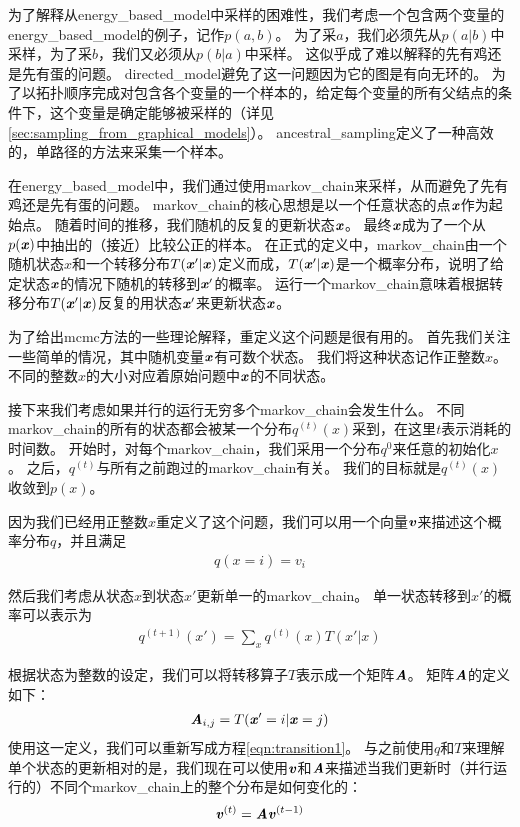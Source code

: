 为了解释从\gls{energy_based_model}中采样的困难性，我们考虑一个包含两个变量的\gls{energy_based_model}的例子，记作$p(a,b)$。
为了采$a$，我们必须先从$p(a\vert b)$中采样，为了采$b$，我们又必须从$p(b\vert a)$中采样。
这似乎成了难以解释的先有鸡还是先有蛋的问题。
\gls{directed_model}避免了这一问题因为它的图是有向无环的。
为了以拓扑顺序完成对包含各个变量的一个样本的，给定每个变量的所有父结点的条件下，这个变量是确定能够被采样的（详见\ref{sec:sampling_from_graphical_models}）。
\gls{ancestral_sampling}定义了一种高效的，单路径的方法来采集一个样本。


在\gls{energy_based_model}中，我们通过使用\gls{markov_chain}来采样，从而避免了先有鸡还是先有蛋的问题。
\gls{markov_chain}的核心思想是以一个任意状态的点$\boldsymbol{\mathit{x}}$作为起始点。
随着时间的推移，我们随机的反复的更新状态$\boldsymbol{\mathit{x}}$。
最终$\boldsymbol{\mathit{x}}$成为了一个从$p(\boldsymbol{\mathit{x}})$中抽出的（接近）比较公正的样本。
在正式的定义中，\gls{markov_chain}由一个随机状态$x$和一个转移分布$T(\boldsymbol{\mathit{x}}'\vert \boldsymbol{\mathit{x}})$定义而成，$T(\boldsymbol{\mathit{x}}'\vert \boldsymbol{\mathit{x}})$是一个概率分布，说明了给定状态$\boldsymbol{\mathit{x}}$的情况下随机的转移到$\boldsymbol{\mathit{x}}'$的概率。
运行一个\gls{markov_chain}意味着根据转移分布$T(\boldsymbol{\mathit{x}}'\vert \boldsymbol{\mathit{x}})$反复的用状态$\boldsymbol{\mathit{x}}'$来更新状态$\boldsymbol{\mathit{x}}$。


为了给出\gls{mcmc}方法的一些理论解释，重定义这个问题是很有用的。
首先我们关注一些简单的情况，其中随机变量$\boldsymbol{\mathit{x}}$有可数个状态。
我们将这种状态记作正整数$x$。
不同的整数$x$的大小对应着原始问题中$\boldsymbol{\mathit{x}}$的不同状态。


接下来我们考虑如果并行的运行无穷多个\gls{markov_chain}会发生什么。
不同\gls{markov_chain}的所有的状态都会被某一个分布$q^{(t)}(x)$采到，在这里$t$表示消耗的时间数。
开始时，对每个\gls{markov_chain}，我们采用一个分布$q^{{0}}$来任意的初始化$x$。
之后，$q^{(t)}$与所有之前跑过的\gls{markov_chain}有关。
我们的目标就是$q^{(t)}(x)$收敛到$p(x)$。

因为我们已经用正整数$x$重定义了这个问题，我们可以用一个向量$\boldsymbol{\mathit{v}}$来描述这个概率分布$q$，并且满足
\begin{align}
q(x = i) = v_i
\end{align}

然后我们考虑从状态$x$到状态$x'$更新单一的\gls{markov_chain}。
单一状态转移到$x'$的概率可以表示为
\begin{align}
\label{eqn:transition1}
q^{(t+1)}(x') = \sum_{x} q^{(t)}(x) T(x'\vert x)
\end{align}


根据状态为整数的设定，我们可以将转移算子$T$表示成一个矩阵$\boldsymbol{\mathit{A}}$。
矩阵$\boldsymbol{\mathit{A}}$的定义如下：
\begin{align}
\boldsymbol{\mathit{A}}_{i,j} = T(\boldsymbol{\mathit{x}}' = i\vert \boldsymbol{\mathit{x}} = j)
\end{align}
使用这一定义，我们可以重新写成方程\ref{eqn:transition1}。
与之前使用$q$和$T$来理解单个状态的更新相对的是，我们现在可以使用$\boldsymbol{\mathit{v}}$和$\boldsymbol{\mathit{A}}$来描述当我们更新时（并行运行的）不同个\gls{markov_chain}上的整个分布是如何变化的：
\begin{align}
\boldsymbol{\mathit{v}}^{(t)} = \boldsymbol{\mathit{A}} \boldsymbol{\mathit{v}}^{(t-1)}
\end{align}

